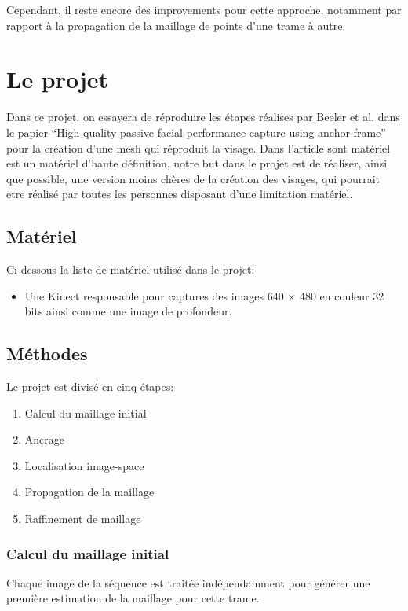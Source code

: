 \documentclass[a4paper,10pt]{article}
\begin{document}
Cependant, il reste encore des improvements pour cette approche, notamment par rapport à la propagation de la maillage de points d'une trame à autre.

\section{Le projet}

Dans ce projet, on essayera de réproduire les étapes réalises par Beeler et al. dans le papier ``High-quality passive facial performance capture using anchor frame'' pour la création d'une mesh qui réproduit la visage.
Dans l'article sont matériel est un matériel d'haute définition, notre but dans le projet est de réaliser, ainsi que possible, une version moins chères de la création des visages, qui pourrait etre réalisé par toutes les personnes disposant d'une limitation matériel.

\subsection{Matériel}
Ci-dessous la liste de matériel utilisé dans le projet: 

\begin{itemize}
\item Une Kinect responsable pour captures des images 640 × 480 en couleur 32 bits ainsi comme une image de profondeur. 
\end{itemize}


\subsection{Méthodes}

Le projet est divisé en cinq étapes: 

\begin{enumerate}
\item Calcul du maillage initial
\item Ancrage
\item Localisation image-space
\item Propagation de la maillage
\item Raffinement de maillage
\end{enumerate}

\subsubsection{Calcul du maillage initial}
Chaque image de la séquence est traitée indépendamment pour générer une première estimation de la maillage pour cette trame.
\end{document}
